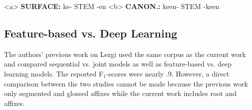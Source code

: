 \pex   
\label{ex:Circumfixes}
\a<a> \textbf{SURFACE:} \hspace{2 mm} ke- \hspace{4 mm}  STEM  \hspace{1 mm} -en
\label{ex:circumsurf}
\a<b> \textbf{CANON.:} \hspace{1 mm} ke\textlangle{}\textrangle{}en- \hspace{1 mm} STEM \hspace{1 mm} -ke\textlangle{}\textrangle{}en
\label{ex:circumcan}
\xe



\subsection{Feature-based vs. Deep Learning}

The authors' previous work on Lezgi \citep{moeller_automatic_2018} used the same corpus as the current work and compared sequential vs. joint models as well as feature-based vs. deep learning models. The reported F$_1$-scores were nearly .9. However, a direct comparison between the two studies cannot be made because the previous work only segmented and glossed affixes while the current work includes root and affixes.


